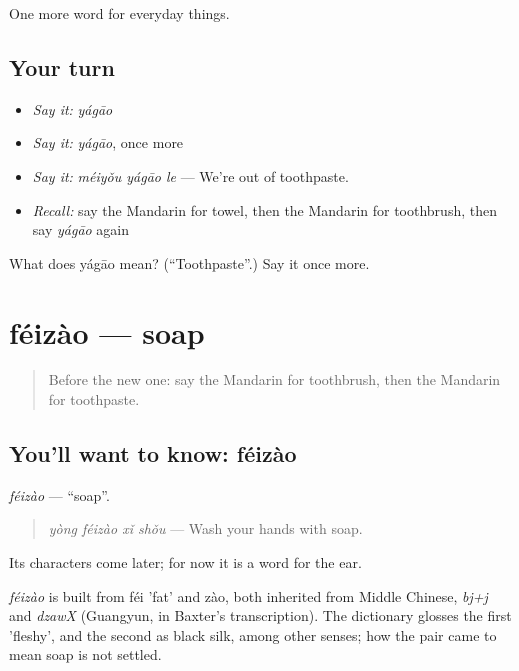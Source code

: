 \begin{grammarlens}[title={What you've built}]
One more word for everyday things.
\end{grammarlens}

\subsection*{Your turn}
\begin{itemize}
\raggedright
  \item \emph{Say it:} \emph{yágāo}
  \item \emph{Say it:} \emph{yágāo}, once more
  \item \emph{Say it:} \emph{méiyǒu yágāo le} — We're out of toothpaste.
  \item \emph{Recall:} say the Mandarin for towel, then the Mandarin for toothbrush, then say \emph{yágāo} again
\end{itemize}

\begin{tcolorbox}[breakable,colback=teal!4,colframe=teal!35!black,title={Before you move on}]
What does yágāo mean? (\textquotedblleft{}Toothpaste\textquotedblright{}.) Say it once more.
\end{tcolorbox}
\section[féizào]{féizào — soap}

\label{lesson:ZH-C105-feizao}



\begin{quote}
Before the new one: say the Mandarin for toothbrush, then the Mandarin for toothpaste.
\end{quote}

\subsection*{You'll want to know: féizào}
\emph{féizào} — \textquotedblleft{}soap\textquotedblright{}.

\begin{quote}
\emph{yòng féizào xǐ shǒu} — Wash your hands with soap.
\end{quote}

Its characters come later; for now it is a word for the ear.

\begin{cousinweb}
\emph{féizào} is built from féi 'fat' and zào, both inherited from Middle Chinese, \emph{bj+j} and \emph{dzawX} (Guangyun, in Baxter's transcription). The dictionary glosses the first 'fleshy', and the second as black silk, among other senses; how the pair came to mean soap is not settled.
\end{cousinweb}

